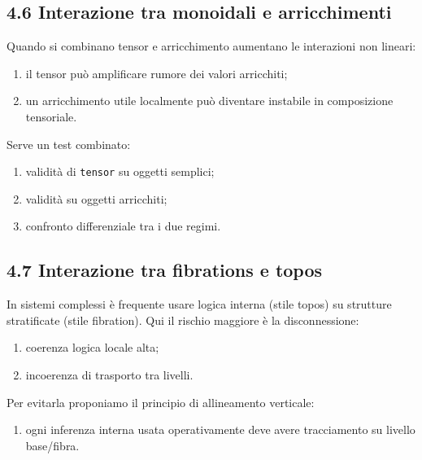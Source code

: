 \subsection{4.6 Interazione tra monoidali e arricchimenti}

Quando si combinano tensor e arricchimento aumentano le interazioni non lineari:

\begin{enumerate}
\def\labelenumi{\arabic{enumi}.}
\tightlist
\item
  il tensor può amplificare rumore dei valori arricchiti;
\item
  un arricchimento utile localmente può diventare instabile in composizione tensoriale.
\end{enumerate}

Serve un test combinato:

\begin{enumerate}
\def\labelenumi{\arabic{enumi}.}
\tightlist
\item
  validità di \texttt{tensor} su oggetti semplici;
\item
  validità su oggetti arricchiti;
\item
  confronto differenziale tra i due regimi.
\end{enumerate}

\subsection{4.7 Interazione tra fibrations e topos}

In sistemi complessi è frequente usare logica interna (stile topos) su strutture stratificate (stile fibration). Qui il rischio maggiore è la disconnessione:

\begin{enumerate}
\def\labelenumi{\arabic{enumi}.}
\tightlist
\item
  coerenza logica locale alta;
\item
  incoerenza di trasporto tra livelli.
\end{enumerate}

Per evitarla proponiamo il principio di allineamento verticale:

\begin{enumerate}
\def\labelenumi{\arabic{enumi}.}
\tightlist
\item
  ogni inferenza interna usata operativamente deve avere tracciamento su livello base/fibra.
\end{enumerate}

